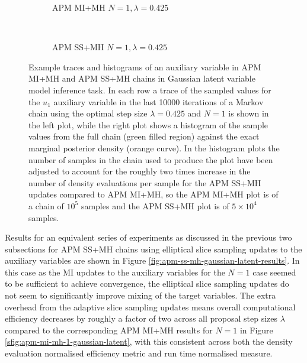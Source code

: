 \begin{figure}
\centering
\begin{subfigure}[b]{\linewidth}
\centering
  \vspace{-5mm}
  \caption{\ac{APM} \ac{MI}+\ac{MH} $N=1, \lambda=0.425$}
  \label{sfig:apm-mi-mh-1-gaussian-latent-u-trace}
\end{subfigure}
\\[3mm]
\begin{subfigure}[b]{\linewidth}
\centering
  \vspace{-5mm}
  \caption{\ac{APM} \ac{SS}+\ac{MH} $N=1, \lambda=0.425$}
  \label{sfig:apm-ss-mh-1-gaussian-latent-u-trace}
\end{subfigure}
\caption[\acs{APM} Gaussian model auxiliary variable traces.]{
Example traces and histograms of an auxiliary variable in \ac{APM} \ac{MI}+\ac{MH} and \ac{APM} \ac{SS}+\ac{MH} chains in Gaussian latent variable model inference task. In each row a trace of the sampled values for the $u_1$ auxiliary variable in the last 10000 iterations of a Markov chain using the optimal step size $\lambda=0.425$ and $N=1$ is shown in the left plot, while the right plot shows a histogram of the sample values from the full chain (green filled region) against the exact marginal posterior density (orange curve). In the histogram plots the number of samples in the chain used to produce the plot have been adjusted to account for the roughly two times increase in the number of density evaluations per sample for the  
\ac{APM} \ac{SS}+\ac{MH} updates compared to \ac{APM} \ac{MI}+\ac{MH}, so the \ac{APM} \ac{MI}+\ac{MH} plot is of a chain of $10^5$ samples and the \ac{APM} \ac{SS}+\ac{MH} plot is of $5\times 10^4$ samples.}
\label{fig:apm-mh-gaussian-latent-u-traces}
\end{figure}

Results for an equivalent series of experiments as discussed in the previous two subsections for \ac{APM} \ac{SS}+\ac{MH} chains using elliptical slice sampling updates to the auxiliary variables are shown in Figure \ref{fig:apm-ss-mh-gaussian-latent-results}. In this case as the \ac{MI} updates to the auxiliary variables for the $N=1$ case seemed to be sufficient to achieve convergence, the elliptical slice sampling updates do not seem to significantly improve mixing of the target variables. The extra overhead from the adaptive slice sampling updates means overall computational efficiency decreases by roughly a factor of two across all proposal step sizes $\lambda$ compared to the corresponding \ac{APM} \ac{MI}+\ac{MH} results for $N=1$ in Figure \ref{sfig:apm-mi-mh-1-gaussian-latent}, with this consistent across both the density evaluation normalised efficiency metric and run time normalised measure. 

